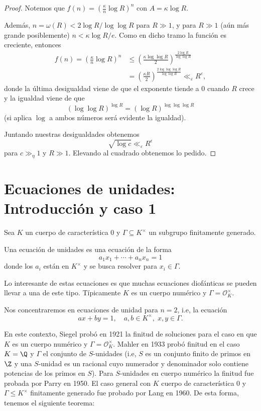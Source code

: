 \documentclass[11pt, reqno]{amsart}
\begin{document}
\begin{proof}
	Notemos que $f(n)=\left( \frac{\kappa}{n}\log R \right)^n$ con $A=\kappa\log R$. 

	Además, $n=\omega(R)<2\log R/\log\log R$ para $R\gg 1$, y para $R\gg 1$ (aún más grande posiblemente) $n<\kappa\log R/e$.
	Como en dicho tramo la función es creciente, entonces
	\begin{align*}
		f(n)=\left( \frac{\kappa}{n}\log R \right)^n&\leq \left( \frac{\kappa\log\log R}{2} \right)^{\frac{2\log R}{\log\log R}}\\
							    &=\left( \frac{\kappa R}{2} \right)^{\frac{2\log\log\log R}{\log\log R}}
							    \ll_{\varepsilon} R^{\varepsilon},
	\end{align*}
	donde la última desigualdad viene de que el exponente tiende a 0 cuando $R$ crece y la igualdad viene de que $$(\log\log R)^{\log R}=(\log R)^{\log\log\log R}$$ (si aplica $\log$ a ambos números será evidente la igualdad).

	Juntando nuestras desigualdades obtenemos $$\sqrt{\log c}\ll_{\varepsilon} R^{\epsilon}$$ para $c\gg_{\eta} 1$ y $R\gg 1$. Elevando al cuadrado obtenemos lo pedido.
\end{proof}

\section{Ecuaciones de unidades: Introducción y caso 1}

Sea $K$ un cuerpo de característica 0 y $\Gamma\subseteq K^{\times}$ un subgrupo finitamente generado. 

Una ecuación de unidades es una ecuación de la forma $$a_1x_1+\cdots+a_nx_n=1$$ donde los $a_i$ están en $K^{\times}$ y se busca resolver para $x_i\in \Gamma$. 

Lo interesante de estas ecuaciones es que muchas ecuaciones diofánticas se pueden llevar a una de este tipo. Típicamente $K$ es un cuerpo numérico y $\Gamma= \mathcal{O}_K^{\times}$.

Nos concentraremos en ecuaciones de unidad para $n=2$, i.e, la ecuación
\begin{equation}
	ax+by=1,\quad a,b\in K^{\times},\; x,y\in \Gamma.
	\label{eu2}
\end{equation} 

En este contexto, Siegel probó en 1921 la finitud de soluciones para el caso en que $K$ es un cuerpo numérico y $\Gamma=\mathcal{O}_K^{\times}$. Mahler en 1933 probó finitud en el caso $K=\Q$ y $\Gamma$ el conjunto de $S$-unidades (i.e, $S$ es un conjunto finito de primos en $\Z$ y una $S$-unidad es un racional cuyo numerador y denominador solo contiene potencias de los primos en $S$). Para $S$-unidades en cuerpo numérico la finitud fue probada por Parry en 1950. El caso general con $K$ cuerpo de característica 0 y $\Gamma\leq K^{\times}$ finitamente generado fue probado por Lang en 1960. De esta forma, tenemos el siguiente teorema:
\end{document}
